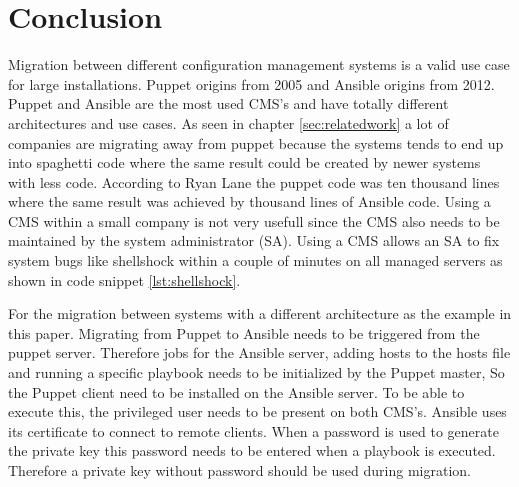 \section{Conclusion}\label{sec:conclusion}
Migration between different configuration management systems is a valid use case for large installations. Puppet origins from 2005 and Ansible origins from 2012. Puppet and Ansible are the most used CMS's and have totally different architectures and use cases. As seen in chapter \ref{sec:relatedwork} a lot of companies are migrating away from puppet because the systems tends to end up into spaghetti code \cite{movingawayfrompuppet} where the same result could be created by newer systems with less code. According to Ryan Lane \cite{movingawayfrompuppet} the puppet code was ten thousand lines where the same result was achieved by thousand lines of Ansible code. Using a CMS within a small company is not very usefull since the CMS also needs to be maintained by the system administrator (SA). Using a CMS allows an SA to fix system bugs like shellshock within a couple of minutes on all managed servers as shown in code snippet \ref{lst:shellshock}.

For the migration between systems with a different architecture as the example in this paper. Migrating from Puppet to Ansible needs to be triggered from the puppet server. Therefore jobs for the Ansible server, adding hosts to the hosts file and running a specific playbook needs to be initialized by the Puppet master, So the Puppet client need to be installed on the Ansible server. To be able to execute this, the privileged user needs to be present on both CMS's. Ansible uses its certificate to connect to remote clients. When a password is used to generate the private key this password needs to be entered when a playbook is executed. Therefore a private key without password should be used during migration.   

